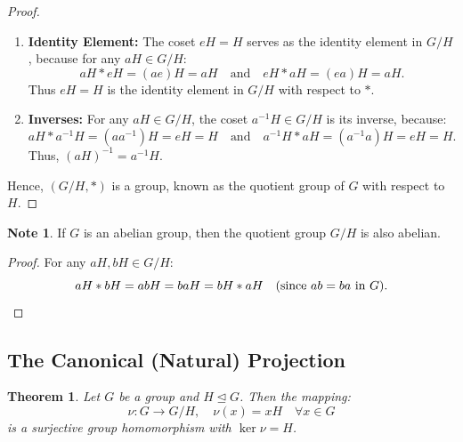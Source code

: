 \documentclass[12pt]{article}
\theoremstyle{definition}
\newtheorem*{note}{Note}
\theoremstyle{plain}
\newtheorem{theorem}{Theorem}[section]
\begin{document}
\begin{proof}
\begin{enumerate}
    \item \textbf{Identity Element:}
    The coset $eH = H$ serves as the identity element in $G/H$, because for any $aH \in G/H$:
    \[
    aH * eH = (ae)H = aH \quad \text{and} \quad eH * aH = (ea)H = aH.
    \]
    Thus $eH = H$ is the identity element in $G/H$ with respect to $*$.
    
    \item \textbf{Inverses:}
    For any $aH \in G/H$, the coset $a^{-1}H \in G/H$ is its inverse, because:
    \[
    aH * a^{-1}H = (aa^{-1})H = eH = H \quad \text{and} \quad a^{-1}H * aH = (a^{-1}a)H = eH = H.
    \]
    Thus, $(aH)^{-1} = a^{-1}H$.
\end{enumerate}
Hence, $(G/H, *)$ is a group, known as the quotient group of $G$ with respect to $H$.
\end{proof}

\begin{note}
If $G$ is an abelian group, then the quotient group $G/H$ is also abelian.
\begin{proof}
For any $aH, bH \in G/H$:
\[
aH * bH = abH = baH = bH * aH \quad (\text{since } ab = ba \text{ in } G). \qedhere
\]
\end{proof}
\end{note}

\subsection{The Canonical (Natural) Projection}

\begin{theorem}
Let $G$ be a group and $H \trianglelefteq G$. Then the mapping:
\[
\nu: G \to G/H, \quad \nu(x) = xH \quad \forall x \in G
\]
is a surjective group homomorphism with $\ker \nu = H$.
\end{theorem}
\end{document}
